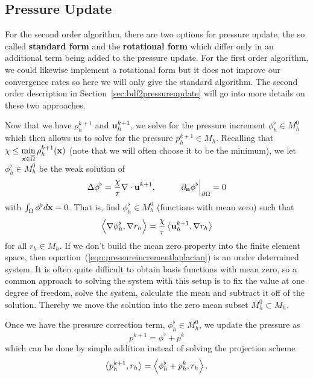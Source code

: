 \documentclass[letterpaper]{erdc}
\begin{document}
%
\subsection{Pressure Update}\label{sec:bdf1pressureupdate}
\begin{remark}
For the second order algorithm, there are two options for pressure update, the so called \textbf{standard form} and the \textbf{rotational form} which differ only in an additional term being added to the pressure update.  For the first order algorithm, we could likewise implement a rotational form but it does not improve our convergence rates so here we will only give the standard algorithm.  The second order description in Section~\ref{sec:bdf2pressureupdate} will go into more details on these two approaches.
\end{remark}

Now that we have $\rho_h^{k+1}$ and $\textbf{u}_h^{k+1}$, we solve for the pressure increment $\phi_h^{\flat}\in M_h^0$ which then allows us to solve for the pressure $p_h^{k+1}\in M_h$.  
Recalling that $\chi \leq \displaystyle\min_{\textbf{x}\in\overline{\Omega}} \rho_h^{k+1}(\textbf{x})$ (note that we will often choose it to be the minimum), we let $\phi_h^{\flat}\in M^0_h$ be the weak solution of
\begin{equation}\label{eqn:pressureincrementlaplacian}
  \Delta \phi^{\flat} = \frac{\chi}{\tau}\nabla\cdot \textbf{u}^{k+1}, \hspace{1cm} \left.\partial_{\textbf{n}}\phi^{\flat}\right|_{\partial\Omega} = 0
\end{equation}
with $\int_{\Omega} \phi^{\flat} d\textbf{x} = 0$.  That is, find $\phi_h^{\flat}\in M_h^0$ (functions with mean zero) such that
\begin{equation}
  \left\langle \nabla\phi_h^{\flat}, \nabla r_h \right\rangle = \frac{\chi}{\tau}\left\langle \textbf{u}_h^{k+1}, \nabla r_h \right\rangle
\end{equation}
for all $r_h \in M_h$.  If we don't build the mean zero property into the finite element space, then equation~(\ref{eqn:pressureincrementlaplacian}) is an under determined system.  It is often quite difficult to obtain basis functions with mean zero, so a common approach to solving the system with this setup is to fix the value at one degree of freedom, solve the system, calculate the mean and subtract it off of the solution.  Thereby we move the solution into the zero mean subset $M_h^0\subset M_h$. 

 Once we have the pressure correction term, $\phi^{\flat}_h\in M_h^0$, we update the pressure as
\begin{equation}\label{eqn:rotationalpressureupdate}
  p^{k+1} = \phi^{\flat} + p^{k}
\end{equation}
which can be done by simple addition instead of solving the projection scheme 
\begin{equation}
  \left\langle p_h^{k+1}, r_h \right\rangle = \left\langle \phi_h^{\flat} + p_h^{k}, r_h \right\rangle.
\end{equation}
\end{document}
